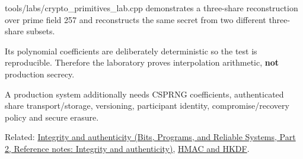 tools/labs/crypto\_primitives\_lab.cpp demonstrates a three-share reconstruction over prime field 257 and reconstructs the same secret from two different three-share subsets.

Its polynomial coefficients are deliberately deterministic so the test is reproducible. Therefore the laboratory proves interpolation arithmetic, \textbf{not} production secrecy.

A production system additionally needs CSPRNG coefficients, authenticated share transport/storage, versioning, participant identity, compromise/recovery policy and secure erasure.

Related: \href{../01-Bits-Programs-and-Reliable-Systems-P02/main.pdf\#appendix-cbe594d1ab0a}{Integrity and authenticity (Bits, Programs, and Reliable Systems, Part 2, Reference notes: Integrity and authenticity)}, \hyperref[appendix-50af792c9da7]{HMAC and HKDF}.
